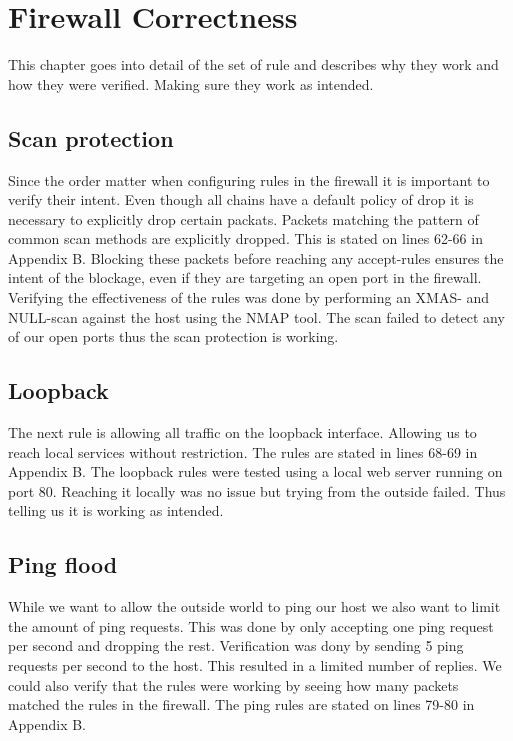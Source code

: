\section{Firewall Correctness}
\label{sec:correctness}
This chapter goes into detail of the set of rule and describes why they work and how they were verified. Making sure they work as intended.

\subsection{Scan protection}
Since the order matter when configuring rules in the firewall it is important to verify their intent. Even though all chains have a default policy of drop it is necessary to explicitly drop certain packats. Packets matching the pattern of common scan methods are explicitly dropped. This is stated on lines 62-66 in Appendix B. Blocking these packets before reaching any accept-rules ensures the intent of the blockage, even if they are targeting an open port in the firewall. Verifying the effectiveness of the rules was done by performing an XMAS- and NULL-scan against the host using the NMAP tool. The scan failed to detect any of our open ports thus the scan protection is working.

\subsection{Loopback}
The next rule is allowing all traffic on the loopback interface. Allowing us to reach local services without restriction. The rules are stated in lines 68-69 in Appendix B. The loopback rules were tested using a local web server running on port 80. Reaching it locally was no issue but trying from the outside failed. Thus telling us it is working as intended.

\subsection{Ping flood}
While we want to allow the outside world to ping our host we also want to limit the amount of ping requests. This was done by only accepting one ping request per second and dropping the rest. Verification was dony by sending 5 ping requests per second to the host. This resulted in a limited number of replies. We could also verify that the rules were working by seeing how many packets matched the rules in the firewall. The ping rules are stated on lines 79-80 in Appendix B.

